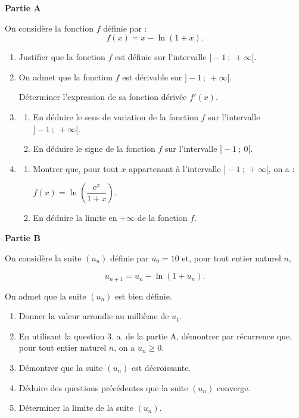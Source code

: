 \medskip

\textbf{Partie A}

\medskip

On considère la fonction $f$ définie par :
\[f(x) = x - \ln (1 + x).\]

\begin{enumerate}
\item Justifier que la fonction $f$ est définie sur l'intervalle $]-1~;~+ \infty[$.

\item On admet que la fonction $f$ est dérivable sur $]-1~;~+ \infty[$.

Déterminer l'expression de sa fonction dérivée $f'(x)$.
\item 
	\begin{enumerate}
		\item En déduire le sens de variation de la fonction $f$ sur l'intervalle $]-1~;~+ \infty[$.
		\item En déduire le signe de la fonction $f$ sur l'intervalle $]-1~;~0[$.
	\end{enumerate}
\item 
	\begin{enumerate}
		\item Montrer que, pour tout $x$ appartenant à l'intervalle $]-1~;~+ \infty[$, on a :

$f(x) = \ln \left(\dfrac{\text{e}^x}{1 + x}\right)$.
		\item En déduire la limite en $+ \infty$ de la fonction $f$.
	\end{enumerate}
\end{enumerate}

\medskip

\textbf{Partie B}

\medskip

On considère la suite $\left(u_n\right)$ définie par $u_0 = 10$ et, pour tout entier naturel $n$,

\[u_{n+1} = u_n- \ln \left(1 + u_n\right).\]

On admet que la suite $\left(u_n\right)$ est bien définie.

\medskip

\begin{enumerate}
\item Donner la valeur arrondie au millième de $u_1$.
\item En utilisant la question 3. a. de la partie A, démontrer par récurrence que, pour
tout entier naturel $n$, on a $u_n \geqslant 0$.
\item Démontrer que la suite $\left(u_n\right)$ est décroissante.
\item Déduire des questions précédentes que la suite $\left(u_n\right)$ converge.
\item Déterminer la limite de la suite $\left(u_n\right)$.

\end{enumerate}

\medskip
